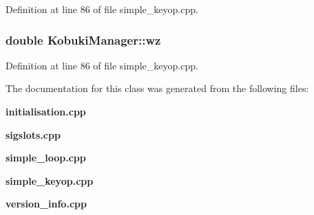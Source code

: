 \-Definition at line 86 of file simple\-\_\-keyop.\-cpp.

\subsubsection[{wz}]{\setlength{\rightskip}{0pt plus 5cm}double {\bf \-Kobuki\-Manager\-::wz}\hspace{0.3cm}{\ttfamily  [private]}}\label{classKobukiManager_a57f270ae72b08bef00fc8906a78b7a58}


\-Definition at line 86 of file simple\-\_\-keyop.\-cpp.



\-The documentation for this class was generated from the following files\-:\begin{DoxyCompactItemize}
\item 
{\bf initialisation.\-cpp}\item 
{\bf sigslots.\-cpp}\item 
{\bf simple\-\_\-loop.\-cpp}\item 
{\bf simple\-\_\-keyop.\-cpp}\item 
{\bf version\-\_\-info.\-cpp}\end{DoxyCompactItemize}
